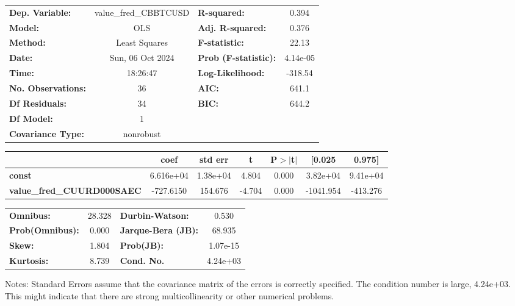 \begin{center}
\begin{tabular}{lclc}
\toprule
\textbf{Dep. Variable:}            & value\_fred\_CBBTCUSD & \textbf{  R-squared:         } &     0.394   \\
\textbf{Model:}                    &          OLS          & \textbf{  Adj. R-squared:    } &     0.376   \\
\textbf{Method:}                   &     Least Squares     & \textbf{  F-statistic:       } &     22.13   \\
\textbf{Date:}                     &    Sun, 06 Oct 2024   & \textbf{  Prob (F-statistic):} &  4.14e-05   \\
\textbf{Time:}                     &        18:26:47       & \textbf{  Log-Likelihood:    } &   -318.54   \\
\textbf{No. Observations:}         &             36        & \textbf{  AIC:               } &     641.1   \\
\textbf{Df Residuals:}             &             34        & \textbf{  BIC:               } &     644.2   \\
\textbf{Df Model:}                 &              1        & \textbf{                     } &             \\
\textbf{Covariance Type:}          &       nonrobust       & \textbf{                     } &             \\
\bottomrule
\end{tabular}
\begin{tabular}{lcccccc}
                                   & \textbf{coef} & \textbf{std err} & \textbf{t} & \textbf{P$> |$t$|$} & \textbf{[0.025} & \textbf{0.975]}  \\
\midrule
\textbf{const}                     &    6.616e+04  &     1.38e+04     &     4.804  &         0.000        &     3.82e+04    &     9.41e+04     \\
\textbf{value\_fred\_CUURD000SAEC} &    -727.6150  &      154.676     &    -4.704  &         0.000        &    -1041.954    &     -413.276     \\
\bottomrule
\end{tabular}
\begin{tabular}{lclc}
\textbf{Omnibus:}       & 28.328 & \textbf{  Durbin-Watson:     } &    0.530  \\
\textbf{Prob(Omnibus):} &  0.000 & \textbf{  Jarque-Bera (JB):  } &   68.935  \\
\textbf{Skew:}          &  1.804 & \textbf{  Prob(JB):          } & 1.07e-15  \\
\textbf{Kurtosis:}      &  8.739 & \textbf{  Cond. No.          } & 4.24e+03  \\
\bottomrule
\end{tabular}
\end{center}

Notes: \newline
 [1] Standard Errors assume that the covariance matrix of the errors is correctly specified. \newline
 [2] The condition number is large, 4.24e+03. This might indicate that there are \newline
 strong multicollinearity or other numerical problems.